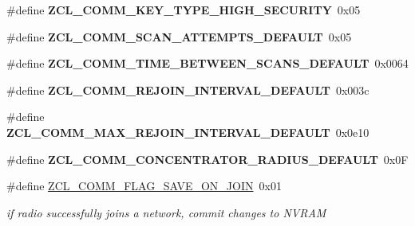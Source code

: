 \begin{DoxyCompactItemize}
\item 
\mbox{\label{group__zcl__commissioning_ga46d75e146e6b77f3c568e86f8fb81b72}} 
\#define {\bfseries Z\+C\+L\+\_\+\+C\+O\+M\+M\+\_\+\+K\+E\+Y\+\_\+\+T\+Y\+P\+E\+\_\+\+H\+I\+G\+H\+\_\+\+S\+E\+C\+U\+R\+I\+TY}~0x05
\item 
\mbox{\label{group__zcl__commissioning_ga59f8071f92e78712954832b5d5d73cb2}} 
\#define {\bfseries Z\+C\+L\+\_\+\+C\+O\+M\+M\+\_\+\+S\+C\+A\+N\+\_\+\+A\+T\+T\+E\+M\+P\+T\+S\+\_\+\+D\+E\+F\+A\+U\+LT}~0x05
\item 
\mbox{\label{group__zcl__commissioning_ga0e146d73ad21faec4d9338470a0267d6}} 
\#define {\bfseries Z\+C\+L\+\_\+\+C\+O\+M\+M\+\_\+\+T\+I\+M\+E\+\_\+\+B\+E\+T\+W\+E\+E\+N\+\_\+\+S\+C\+A\+N\+S\+\_\+\+D\+E\+F\+A\+U\+LT}~0x0064
\item 
\mbox{\label{group__zcl__commissioning_gac94f1c5753e8b1e71475cfcda4011150}} 
\#define {\bfseries Z\+C\+L\+\_\+\+C\+O\+M\+M\+\_\+\+R\+E\+J\+O\+I\+N\+\_\+\+I\+N\+T\+E\+R\+V\+A\+L\+\_\+\+D\+E\+F\+A\+U\+LT}~0x003c
\item 
\mbox{\label{group__zcl__commissioning_ga9c45d709d61ef3f0dba6f9f139d9bc16}} 
\#define {\bfseries Z\+C\+L\+\_\+\+C\+O\+M\+M\+\_\+\+M\+A\+X\+\_\+\+R\+E\+J\+O\+I\+N\+\_\+\+I\+N\+T\+E\+R\+V\+A\+L\+\_\+\+D\+E\+F\+A\+U\+LT}~0x0e10
\item 
\mbox{\label{group__zcl__commissioning_ga4f551f972a8e6ec65cf90a888fe80758}} 
\#define {\bfseries Z\+C\+L\+\_\+\+C\+O\+M\+M\+\_\+\+C\+O\+N\+C\+E\+N\+T\+R\+A\+T\+O\+R\+\_\+\+R\+A\+D\+I\+U\+S\+\_\+\+D\+E\+F\+A\+U\+LT}~0x0F
\item 
\mbox{\label{group__zcl__commissioning_ga83365bb85e2b264c1741d75e8522a754}} 
\#define \hyperlink{group__zcl__commissioning_ga83365bb85e2b264c1741d75e8522a754}{Z\+C\+L\+\_\+\+C\+O\+M\+M\+\_\+\+F\+L\+A\+G\+\_\+\+S\+A\+V\+E\+\_\+\+O\+N\+\_\+\+J\+O\+IN}~0x01
\begin{DoxyCompactList}\small\item\em if radio successfully joins a network, commit changes to N\+V\+R\+AM \end{DoxyCompactList}\item 

\end{DoxyCompactItemize}
